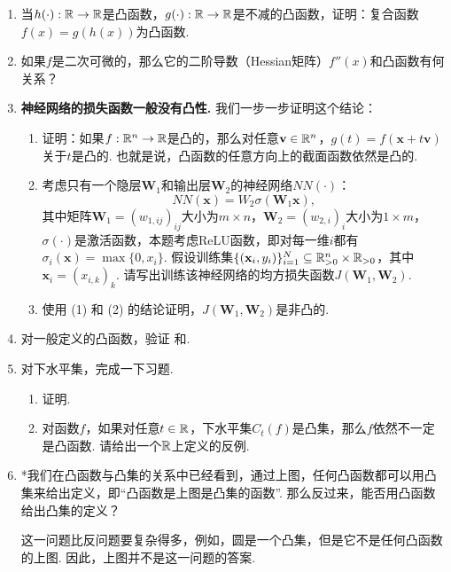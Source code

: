 \begin{enumerate}[wide, labelindent=0pt]
    \item \label{exercise:convex-operation} 当$h(\cdot):\mathbb{R}\to\mathbb{R}$是凸函数，$g(\cdot):\mathbb{R}\to\mathbb{R}$是不减的凸函数，证明：复合函数$f(x) = g(h(x))$为凸函数.
    
    \item 如果$f$是二次可微的，那么它的二阶导数（Hessian矩阵）$f''(x)$和凸函数有何关系？

    \item \textbf{神经网络的损失函数一般没有凸性.} 我们一步一步证明这个结论：
        \begin{enumerate}
            \item 证明：如果$f:\mathbb{R}^n\to \mathbb{R}$是凸的，那么对任意$\mathbf v\in\mathbb{R}^n$，$g(t) = f(\mathbf x+t\mathbf v)$关于$t$是凸的. 也就是说，凸函数的任意方向上的截面函数依然是凸的.
            \item 考虑只有一个隐层$\mathbf W_1$和输出层$\mathbf W_2$的神经网络$NN(\cdot)$：
            \[NN(\mathbf{x})= W_2\sigma(\mathbf W_1\mathbf{x}),\]
            其中矩阵$\mathbf W_1=(w_{1,ij})_{ij}$大小为$m\times n$，$\mathbf W_2=(w_{2,i})_i$大小为$1\times m$，$\sigma(\cdot)$是激活函数，本题考虑ReLU函数，即对每一维$i$都有$\sigma_i(\mathbf x)=\max\{0,x_i\}$. 假设训练集$\{(\mathbf{x}_i,y_i)\}_{i=1}^N\subseteq \mathbb{R}_{>0}^n\times \mathbb{R}_{>0}$，其中$\mathbf x_i=(x_{i,k})_k$. 请写出训练该神经网络的均方损失函数$J(\mathbf W_1,\mathbf W_2)$.
            \item 使用 (1) 和 (2) 的结论证明，$J(\mathbf W_1,\mathbf W_2)$是非凸的.
        \end{enumerate}

    \item \label{exercise:convex-function-general-property} 对一般定义的凸函数，验证 和.
    
    \item \label{exercise:convex-level-set} 对下水平集，完成一下习题. 
    \begin{enumerate}
        \item 证明. 
        \item 对函数$f$，如果对任意$t\in\mathbb{R}$，下水平集$C_t(f)$是凸集，那么$f$依然不一定是凸函数. 请给出一个$\mathbb{R}$上定义的反例.
    \end{enumerate}
    
    \item *我们在凸函数与凸集的关系中已经看到，通过上图，任何凸函数都可以用凸集来给出定义，即“凸函数是上图是凸集的函数”. 那么反过来，能否用凸函数给出凸集的定义？
    \begin{hint}
        这一问题比反问题要复杂得多，例如，圆是一个凸集，但是它不是任何凸函数的上图. 因此，上图并不是这一问题的答案.
    \end{hint}
    

\end{enumerate}

